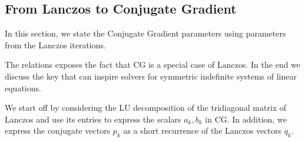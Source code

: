 \documentclass[]{article}
\theoremstyle{definition}
\begin{document}
    \subsection{From Lanczos to Conjugate Gradient}
            In this section, we state the Conjugate Gradient parameters using parameters from the Lanczos iterations. 
            \par
            The relations exposes the fact that CG is a special case of Lanczos. In the end we discuss the key that can inspire solvers for symmetric indefinite systems of linear equations. 
            \par
            We start off by considering the LU decomposition of the tridiagonal matrix of Lanczos and use its entries to express the scalars $a_k, b_k$ in CG. In addition, we express the conjugate vectors $p_k$ as a short recurrence of the Lanczos vectors $q_k$. 
\end{document}
